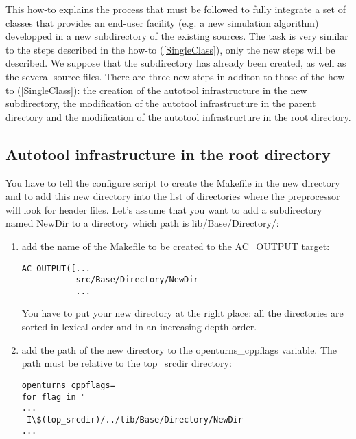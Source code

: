 \documentclass[11pt]{article}
\begin{document}
This how-to explains the process that must be followed to fully integrate a set of classes that provides an end-user facility (e.g. a new simulation algorithm) developped in a new subdirectory of the existing sources. The task is very similar to the steps described in the how-to (\ref{SingleClass}), only the new steps will be described. We suppose that the subdirectory has already been created, as well as the several source files. There are three new steps in additon to those of the how-to (\ref{SingleClass}): the creation of the autotool infrastructure in the new subdirectory, the modification of the autotool infrastructure in the parent directory and the modification of the autotool infrastructure in the root directory.


\subsection{Autotool infrastructure in the root directory}
You have to tell the configure script to create the Makefile in the new directory and to add this new directory into the list of directories where the preprocessor will look for header files. Let's assume that you want to add a subdirectory named NewDir to a directory which path is lib/Base/Directory/:
\begin{enumerate}
\item add the name of the Makefile to be created to the AC\_OUTPUT target:
\begin{verbatim}
AC_OUTPUT([...
           src/Base/Directory/NewDir
           ...
\end{verbatim}
  You have to put your new directory at the right place: all the directories are sorted in lexical order and in an increasing depth order.
  
\item add the path of the new directory to the openturns\_cppflags variable. The path must be relative to the top\_srcdir directory:
\begin{verbatim}
openturns_cppflags=
for flag in "
...
-I\$(top_srcdir)/../lib/Base/Directory/NewDir
...
\end{verbatim}

\end{enumerate}
\end{document}
